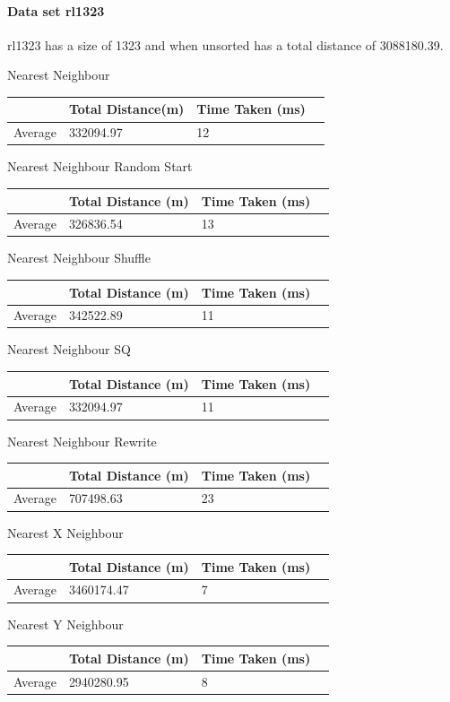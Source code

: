 \documentclass[conference,backref=page]{acmsiggraph}
\begin{document}
\paragraph{Data set rl1323} \hfill

rl1323 has a size of 1323 and when unsorted has a total distance of 3088180.39. 

\begin{center}	
	
	Nearest Neighbour
	\begin{tabular}{| l | l | l | l |}
		\hline
		& Total Distance(m)& Time Taken (ms)\\ \hline
		Average & 332094.97 & 12 \\ \hline
	\end{tabular}
	
	Nearest Neighbour Random Start
	\begin{tabular}{| l | l | l | l |}
		\hline
		& Total Distance (m) & Time Taken (ms)\\ \hline
		Average & 326836.54 & 13 \\ \hline
	\end{tabular}
	
	Nearest Neighbour Shuffle
	\begin{tabular}{| l | l | l | l |}
		\hline
		& Total Distance (m) & Time Taken (ms)\\ \hline
		Average & 342522.89 & 11 \\ \hline
	\end{tabular}
	
	Nearest Neighbour SQ
	\begin{tabular}{| l | l | l | l |}
		\hline
		& Total Distance (m) & Time Taken (ms)\\ \hline
		Average & 332094.97 & 11 \\ \hline
	\end{tabular}
	
	Nearest Neighbour Rewrite
	\begin{tabular}{| l | l | l | l |}
		\hline
		& Total Distance (m) & Time Taken (ms)\\ \hline
		Average & 707498.63 & 23 \\ \hline
	\end{tabular}
	
	
	Nearest X Neighbour	
	\begin{tabular}{| l | l | l | l |}
		\hline
		& Total Distance (m) & Time Taken (ms)\\ \hline
		Average & 3460174.47 & 7 \\ \hline	
	\end{tabular}
	
	Nearest Y Neighbour	
	\begin{tabular}{| l | l | l | l |}
		\hline
		& Total Distance (m) & Time Taken (ms)\\ \hline
		Average & 2940280.95 & 8 \\ \hline
	\end{tabular}
\end{center}
\end{document}
